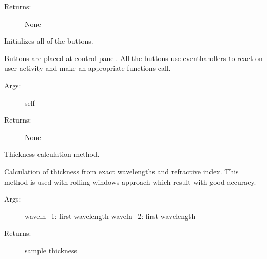 \documentclass[letterpaper,10pt,english]{sphinxmanual}
\begin{document}
\begin{fulllineitems}
\begin{fulllineitems}
\begin{description}
\item[{Returns:}] \leavevmode
None

\end{description}

\end{fulllineitems}


\begin{fulllineitems}
\label{\detokenize{GUI:GUI.MyPanel.show_buttons}}
Initializes all of the buttons.

Buttons are placed at control panel. All the buttons use event\sphinxhyphen{}handlers
to react on user activity and make an appropriate functions call.
\begin{description}
\item[{Args:}] \leavevmode
self

\item[{Returns:}] \leavevmode
None

\end{description}

\end{fulllineitems}


\end{fulllineitems}


\begin{fulllineitems}
\label{\detokenize{GUI:GUI.adv_dist_calc}}
Thickness calculation method.

Calculation of thickness from exact wavelengths and refractive index. This
method is used with rolling windows approach which result with good accuracy.
\begin{description}
\item[{Args:}] \leavevmode
waveln\_1: first wavelength
waveln\_2: first wavelength

\item[{Returns:}] \leavevmode
sample thickness

\end{description}

\end{fulllineitems}
\end{document}
